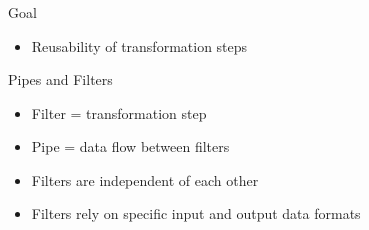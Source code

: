 \begin{frame}
    \frametitle{\insertsubsection{}}
    \begin{fancycolumns}[widths={45,55}]
        \begin{motivation}{Goal}
            \begin{itemize}
                \item Reusability of transformation steps
            \end{itemize}
        \end{motivation}
        \begin{definition}{Pipes and Filters}
            \begin{itemize}
                \item Filter = transformation step
                \item Pipe = data flow between filters
                \item Filters are independent of each other
                \item Filters rely on specific input and output data formats
            \end{itemize}
        \end{definition}
        \nextcolumn
        \pipesfiltersdefault{}
    \end{fancycolumns}
\end{frame}

